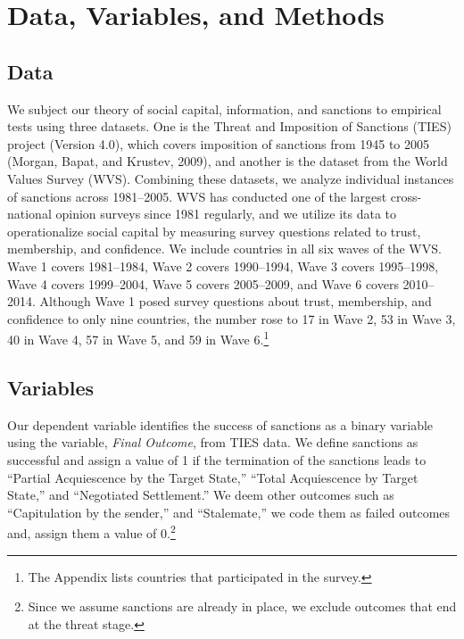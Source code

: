 \documentclass[
  english,
  man]{apa6}
\begin{document}
\hypertarget{data-variables-and-methods}{%
\section{Data, Variables, and Methods}\label{data-variables-and-methods}}

\hypertarget{data}{%
\subsection{Data}\label{data}}

We subject our theory of social capital, information, and sanctions to empirical tests using three datasets. One is the Threat and Imposition of Sanctions (TIES) project (Version 4.0), which covers imposition of sanctions from 1945 to 2005 (Morgan, Bapat, and Krustev, 2009), and another is the dataset from the World Values Survey (WVS). Combining these datasets, we analyze individual instances of sanctions across 1981--2005. WVS has conducted one of the largest cross-national opinion surveys since 1981 regularly, and we utilize its data to operationalize social capital by measuring survey questions related to trust, membership, and confidence. We include countries in all six waves of the WVS. Wave 1 covers 1981--1984, Wave 2 covers 1990--1994, Wave 3 covers 1995--1998, Wave 4 covers 1999--2004, Wave 5 covers 2005--2009, and Wave 6 covers 2010--2014. Although Wave 1 posed survey questions about trust, membership, and confidence to only nine countries, the number rose to 17 in Wave 2, 53 in Wave 3, 40 in Wave 4, 57 in Wave 5, and 59 in Wave 6.\footnote{The Appendix lists countries that participated in the survey.}

\hypertarget{variables}{%
\subsection{Variables}\label{variables}}

Our dependent variable identifies the success of sanctions as a binary variable using the variable, \emph{Final Outcome}, from TIES data. We define sanctions as successful and assign a value of 1 if the termination of the sanctions leads to ``Partial Acquiescence by the Target State,'' ``Total Acquiescence by Target State,'' and ``Negotiated Settlement.'' We deem other outcomes such as ``Capitulation by the sender,'' and ``Stalemate,'' we code them as failed outcomes and, assign them a value of 0.\footnote{Since we assume sanctions are already in place, we exclude outcomes that end at the threat stage.}
\end{document}
